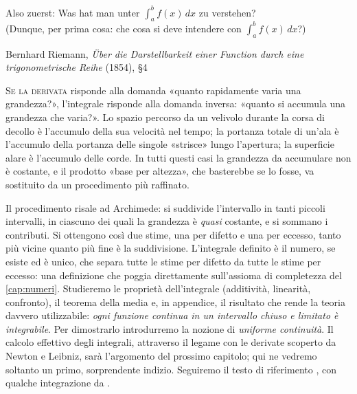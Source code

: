 
\epigraph{Also zuerst: Was hat man unter $\int_{a}^{b}f(x)\,dx$ zu verstehen?\\[2pt]
\upshape(Dunque, per prima cosa: che cosa si deve intendere con
$\int_{a}^{b}f(x)\,dx$?)}{Bernhard Riemann, \emph{Über die Darstellbarkeit einer
Function durch eine trigonometrische Reihe} (1854), \S4}

\lettrine[lines=3, findent=2pt, nindent=0pt]{S}{e la derivata} risponde alla domanda
«quanto rapidamente varia una grandezza?», l'integrale risponde alla domanda inversa:
«quanto si accumula una grandezza che varia?». Lo spazio percorso da un velivolo durante
la corsa di decollo è l'accumulo della sua velocità nel tempo; la portanza totale di
un'ala è l'accumulo della portanza delle singole «strisce» lungo l'apertura; la
superficie alare è l'accumulo delle corde. In tutti questi casi la grandezza da
accumulare non è costante, e il prodotto «base per altezza», che basterebbe se lo
fosse, va sostituito da un procedimento più raffinato.

Il procedimento risale ad Archimede: si suddivide l'intervallo in tanti piccoli
intervalli, in ciascuno dei quali la grandezza è \emph{quasi} costante, e si sommano i
contributi. Si ottengono così due stime, una per difetto e una per eccesso, tanto più
vicine quanto più fine è la suddivisione. L'integrale definito è il numero, se esiste ed
è unico, che separa tutte le stime per difetto da tutte le stime per eccesso: una
definizione che poggia direttamente sull'assioma di completezza del
\cref{cap:numeri}. Studieremo le proprietà dell'integrale (additività, linearità,
confronto), il teorema della media e, in appendice, il risultato che rende la teoria
davvero utilizzabile: \emph{ogni funzione continua in un intervallo chiuso e limitato è
integrabile}. Per dimostrarlo introdurremo la nozione di \emph{uniforme continuità}.
Il calcolo effettivo degli integrali, attraverso il legame con le derivate scoperto da
Newton e Leibniz, sarà l'argomento del prossimo capitolo; qui ne vedremo soltanto un
primo, sorprendente indizio. Seguiremo il testo di riferimento
\cite{marcellini-sbordone}, con qualche integrazione da \cite{giusti}.

